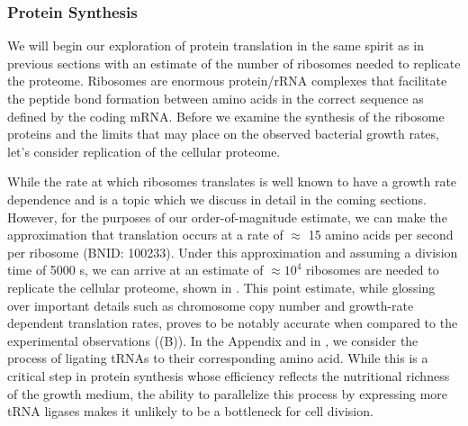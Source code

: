 \subsubsection{Protein Synthesis}
We will begin our exploration of protein translation in the same spirit as in
previous sections with an estimate of the number of ribosomes needed to
replicate the proteome. Ribosomes are enormous
protein/rRNA complexes that facilitate the peptide bond formation between amino
acids in the correct sequence as defined by the coding mRNA. Before we examine
the synthesis of the ribosome proteins and the limits that may place on the
observed bacterial growth rates, let's consider replication of the cellular
proteome.

While the rate at which ribosomes translates is well known to have a growth
rate dependence \cite{dai2018} and is a topic which we discuss in detail in
the coming sections. However, for the purposes of our order-of-magnitude
estimate, we can make the approximation that translation occurs at a rate of
$\approx$ 15 amino acids per second per ribosome (BNID: 100233). Under this
approximation and assuming a division time of 5000 s, we can arrive at an
estimate of $\approx 10^4$ ribosomes are needed to replicate the cellular
proteome, shown in . This point estimate, while
glossing over important details such as chromosome copy number and
growth-rate dependent translation rates, proves to be notably accurate when
compared to the experimental observations ((B)). In the
Appendix and in , we consider the process of
ligating tRNAs to their corresponding amino acid. While this is a critical step
in protein synthesis whose efficiency reflects the nutritional richness of the
growth medium, the ability to parallelize this process by expressing more tRNA
ligases makes it unlikely to be a bottleneck for cell division.

